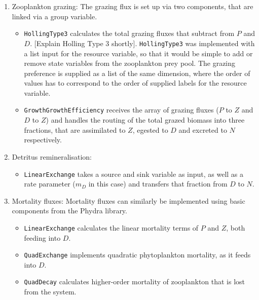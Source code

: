\documentclass[journal abbreviation, manuscript]{copernicus}
\begin{document}
\begin{enumerate}
    \item Zooplankton grazing: The grazing flux is set up via two components, that are linked via a group variable.
    \begin{itemize}    
        \item \texttt{HollingType3} calculates the total grazing fluxes that subtract from $P$ and $D$. [Explain Holling Type 3 shortly]. \texttt{HollingType3} was implemented with a list input for the resource variable, so that it would be simple to add or remove state variables from the zooplankton prey pool. The grazing preference is supplied as a list of the same dimension, where the order of values has to correspond to the order of supplied labels for the resource variable. 
        \item \texttt{GrowthGrowthEfficiency} receives the array of grazing fluxes ($P$ to $Z$ and $D$ to $Z$) and handles the routing of the total grazed biomass into three fractions, that are assimilated to $Z$, egested to $D$ and excreted to $N$ respectively.
    \end{itemize}
    
    \item Detritus remineralisation:
    \begin{itemize}
        \item \texttt{LinearExchange} takes a source and sink variable as input, as well as a rate parameter ($m_D$ in this case) and transfers that fraction from $D$ to $N$.
    \end{itemize}
    
    \item Mortality fluxes: Mortality fluxes can similarly be implemented using basic components from the Phydra library.
    \begin{itemize}
        \item \texttt{LinearExchange} calculates the linear mortality terms of $P$ and $Z$, both feeding into $D$. 
        \item \texttt{QuadExchange} implements quadratic phytoplankton mortality, as it feeds into $D$. 
        \item \texttt{QuadDecay} calculates higher-order mortality of zooplankton that is lost from the system.
    \end{itemize}
\end{enumerate}
\end{document}
